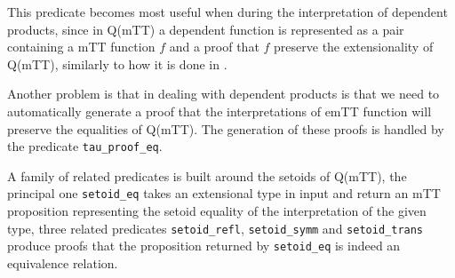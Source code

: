 	This predicate becomes most useful when during the interpretation of dependent products, since in Q(mTT) a dependent function is represented as a pair containing a mTT function $f$ and a proof that $f$ preserve the extensionality of Q(mTT), similarly to how it is done in \cite{necula1997proof}.
	
	Another problem is that in dealing with dependent products is that we need to automatically generate a proof that the interpretations of emTT function will preserve the equalities of Q(mTT). The generation of these proofs is handled by the predicate \verb|tau_proof_eq|.
	
	A family of related predicates is built around the setoids of Q(mTT), the principal one \verb|setoid_eq| takes an extensional type in input and return an mTT proposition representing the setoid equality of the interpretation of the given type, three related predicates \verb|setoid_refl|, \verb|setoid_symm| and \verb|setoid_trans| produce proofs that the proposition returned by \verb|setoid_eq| is indeed an equivalence relation.

